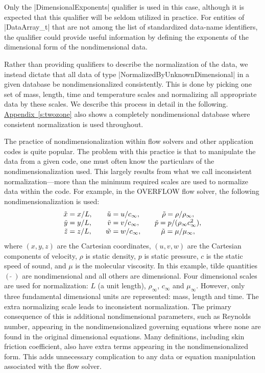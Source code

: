 Only the |DimensionalExponents| qualifier is used in this case,
although it is expected that this qualifier will be seldom utilized in
practice.  For entities of |DataArray_t| that are not among the list of
standardized data-name identifiers, the qualifier could provide useful
information by defining the exponents of the dimensional form of the
nondimensional data.

Rather than providing qualifiers to describe the normalization of the data,
we instead dictate that all data of type |NormalizedByUnknownDimensional|
in a given database be nondimensionalized consistently.  This is done by
picking one set of mass, length, time and temperature scales and normalizing
all appropriate data by these scales.  We describe this process in detail in
the following.  \hyperref[s:twozone]{Appendix~\ref*{s:twozone}} also shows
a completely nondimensional database where consistent normalization is used
throughout.

The practice of nondimensionalization within flow solvers and other
application codes is quite popular.  The problem with this practice
is that to manipulate the data from a given code, one must often know
the particulars of the nondimensionalization used.  This largely
results from what we call inconsistent normalization---more than
the minimum required scales are used to normalize data within the
code.  For example, in the OVERFLOW flow solver, the following
nondimensionalization is used:
$$
\begin{array}{c@{\qquad}c@{\qquad}c}
 \tilde{x} = x/L, & \tilde{u} = u/c_\infty, & \tilde{\rho} = \rho/\rho_\infty, \\ 
 \tilde{y} = y/L, & \tilde{v} = v/c_\infty, & \tilde{p} = p/(\rho_\infty c_\infty^2), \\
 \tilde{z} = z/L, & \tilde{w} = w/c_\infty, & \tilde{\mu} = \mu/\mu_\infty,
\end{array}
$$
where $(x,y,z)$ are the Cartesian coordinates, $(u,v,w)$ are the
Cartesian components of velocity, $\rho$ is static density, $p$ is
static pressure, $c$ is the static speed of sound, and $\mu$ is the
molecular viscosity.
In this example, tilde quantities $(\:\tilde{}\:)$ are nondimensional
and all others are dimensional.
Four dimensional scales are used for normalization: $L$ (a unit length),
$\rho_\infty$, $c_\infty$ and $\mu_\infty$.
However, only three fundamental dimensional units are represented: mass,
length and time.  The extra normalizing scale leads to inconsistent
normalization.  The primary consequence of this is additional
nondimensional parameters, such as Reynolds number, appearing in
the nondimensionalized governing equations where none are found in
the original dimensional equations.  Many definitions, including
skin friction coefficient, also have extra terms appearing in the
nondimensionalized form.  This adds unnecessary complication to any data
or equation manipulation associated with the flow solver.

